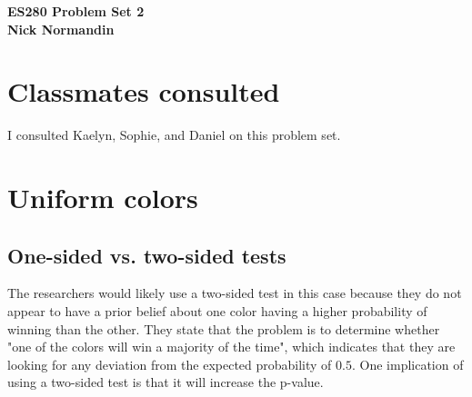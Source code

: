 \documentclass{article}
\begin{document}
\noindent
\textbf{ES280 Problem Set 2} \\
\textbf{Nick Normandin} \\
\section*{Classmates consulted}
I consulted Kaelyn, Sophie, and Daniel on this problem set.

\section{Uniform colors}%
\label{sec:Uniform colors}

\subsection{One-sided vs. two-sided tests}%
The researchers would likely use a two-sided test in this case because they do not appear to have a prior belief about one color having a higher probability of winning than the other. They state that the problem is to determine whether "one of the colors will win a majority of the time", which indicates that they are looking for any deviation from the expected probability of $0.5$. One implication of using a two-sided test is that it will increase the p-value.
\label{sub:One-sided vs. two-sided tests}
\end{document}
